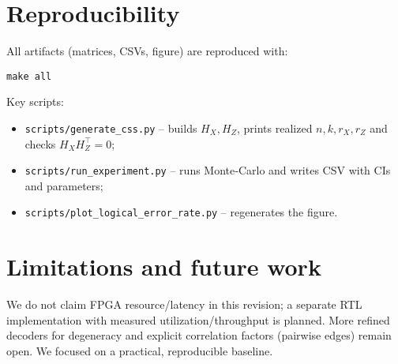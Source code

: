 \documentclass[11pt]{article}
\begin{document}
\section{Reproducibility}
All artifacts (matrices, CSVs, figure) are reproduced with:
\begin{verbatim}
make all
\end{verbatim}
Key scripts:
\begin{itemize}
  \item \texttt{scripts/generate\_css.py} – builds \(H_X,H_Z\), prints
        realized \(n,k,r_X,r_Z\) and checks \(H_X H_Z^\top=0\);
  \item \texttt{scripts/run\_experiment.py} – runs Monte‑Carlo and writes CSV
        with CIs and parameters;
  \item \texttt{scripts/plot\_logical\_error\_rate.py} – regenerates the figure.
\end{itemize}

\section{Limitations and future work}
We do not claim FPGA resource/latency in this revision; a separate RTL
implementation with measured utilization/throughput is planned. More refined
decoders for degeneracy and explicit correlation factors (pairwise edges)
remain open. We focused on a practical, reproducible baseline.
\end{document}
